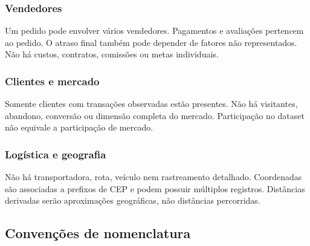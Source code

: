 \documentclass[12pt,a4paper]{article}
\begin{document}
\subsubsection{Vendedores}\label{docs__analytics__contrato_analitico.md__vendedores-1}

Um pedido pode envolver vários vendedores. Pagamentos e avaliações
pertencem ao pedido. O atraso final também pode depender de fatores não
representados. Não há custos, contratos, comissões ou metas individuais.

\subsubsection{Clientes e
mercado}\label{docs__analytics__contrato_analitico.md__clientes-e-mercado}

Somente clientes com transações observadas estão presentes. Não há
visitantes, abandono, conversão ou dimensão completa do mercado.
Participação no dataset não equivale a participação de mercado.

\subsubsection{Logística e
geografia}\label{docs__analytics__contrato_analitico.md__loguxedstica-e-geografia}

Não há transportadora, rota, veículo nem rastreamento detalhado.
Coordenadas são associadas a prefixos de CEP e podem possuir múltiplos
registros. Distâncias derivadas serão aproximações geográficas, não
distâncias percorridas.

\subsection{Convenções de
nomenclatura}\label{docs__analytics__contrato_analitico.md__convenuxe7uxf5es-de-nomenclatura}
\end{document}
